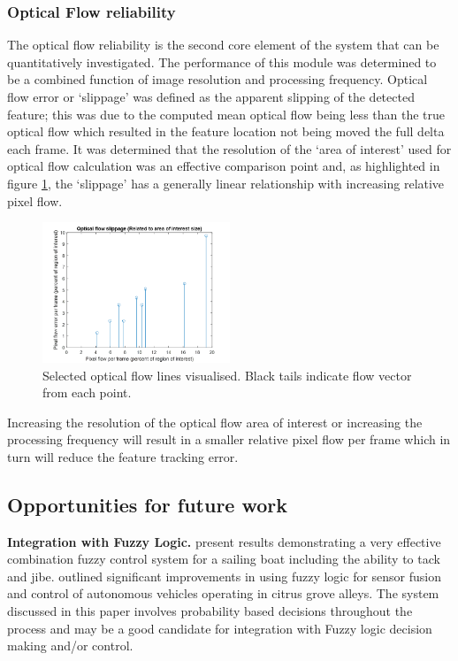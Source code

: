 \documentclass[]{aiaa-tc}%
\begin{document}
\subsubsection{Optical Flow reliability}\label{s:performance:opticalflow}

The optical flow reliability is the second core element of the system that can be quantitatively investigated. The performance of this module was determined to be a combined function of image resolution and processing frequency. Optical flow error or `slippage' was defined as the apparent slipping of the detected feature; this was due to the computed mean optical flow being less than the true optical flow which resulted in the feature location not being moved the full delta each frame. It was determined that the resolution of the `area of interest' used for optical flow calculation was an effective comparison point and, as highlighted in figure \ref{f:opticalFlowResults}, the `slippage' has a generally linear relationship with increasing relative pixel flow.

\begin{figure} %
	\centering
	\includegraphics[width=0.5\textwidth]{Results/opticalFlowResults.png}
	\caption{Selected optical flow lines visualised. Black tails indicate flow vector from each point.}
	\label{f:opticalFlowResults}
\end{figure}

Increasing the resolution of the optical flow area of interest or increasing the processing frequency will result in a smaller relative pixel flow per frame which in turn will reduce the feature tracking error.

\subsection{Opportunities for future work} \label{s:improvements}

\textbf{Integration with Fuzzy Logic.} \citet{fuzzySail} present results demonstrating a very effective combination fuzzy control system for a sailing boat including the ability to tack and jibe. \citet{fuzzyGrove} outlined significant improvements in using fuzzy logic for sensor fusion and control of autonomous vehicles operating in citrus grove alleys. The system discussed in this paper involves probability based decisions throughout the process and may be a good candidate for integration with Fuzzy logic decision making and/or control.
\end{document}
